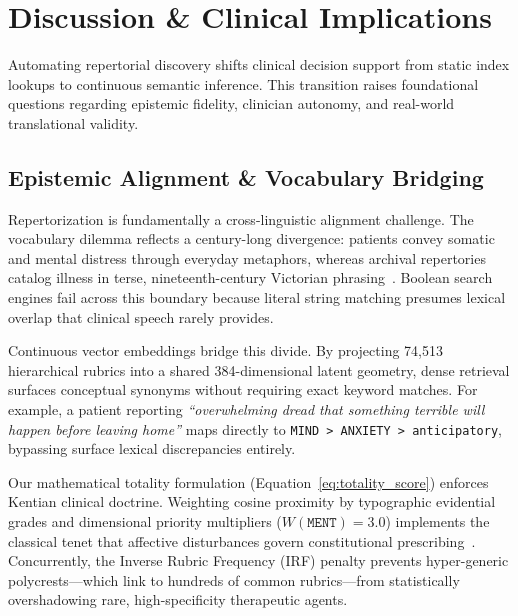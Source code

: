 \section{Discussion \& Clinical Implications}
\label{sec:discussion}

Automating repertorial discovery shifts clinical decision support from static index lookups to continuous semantic inference. This transition raises foundational questions regarding epistemic fidelity, clinician autonomy, and real-world translational validity.

\subsection{Epistemic Alignment \& Vocabulary Bridging}

Repertorization is fundamentally a cross-linguistic alignment challenge. The vocabulary dilemma reflects a century-long divergence: patients convey somatic and mental distress through everyday metaphors, whereas archival repertories catalog illness in terse, nineteenth-century Victorian phrasing~\cite{kent1897,radaropus2024}. Boolean search engines fail across this boundary because literal string matching presumes lexical overlap that clinical speech rarely provides.

Continuous vector embeddings bridge this divide. By projecting 74,513 hierarchical rubrics into a shared 384-dimensional latent geometry, dense retrieval surfaces conceptual synonyms without requiring exact keyword matches. For example, a patient reporting \textit{``overwhelming dread that something terrible will happen before leaving home''} maps directly to \texttt{MIND > ANXIETY > anticipatory}, bypassing surface lexical discrepancies entirely.

Our mathematical totality formulation (Equation~\ref{eq:totality_score}) enforces Kentian clinical doctrine. Weighting cosine proximity by typographic evidential grades and dimensional priority multipliers ($W(\texttt{MENT}) = 3.0$) implements the classical tenet that affective disturbances govern constitutional prescribing~\cite{hahnemann1842,sherr2002}. Concurrently, the Inverse Rubric Frequency (IRF) penalty prevents hyper-generic polycrests---which link to hundreds of common rubrics---from statistically overshadowing rare, high-specificity therapeutic agents.

